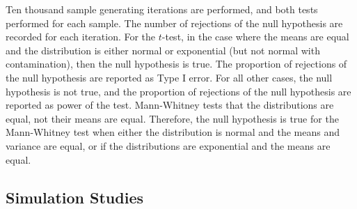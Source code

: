 \documentclass{article}
\begin{document}
Ten thousand sample generating iterations are performed, and both tests performed for each sample. The number of rejections of the null hypothesis are recorded for each iteration. For the $t$-test, in the case where the means are equal and the distribution is either normal or exponential (but not normal with contamination), then the null hypothesis is true. The proportion of rejections of the null hypothesis are reported as Type I error. For all other cases, the null hypothesis is not true, and the proportion of rejections of the null hypothesis are reported as power of the test. Mann-Whitney tests that the distributions are equal, not their means are equal. Therefore, the null hypothesis is true for the Mann-Whitney test when either the distribution is normal and the means and variance are equal, or if the distributions are exponential and the means are equal. 



\subsection*{Simulation Studies}
\end{document}
